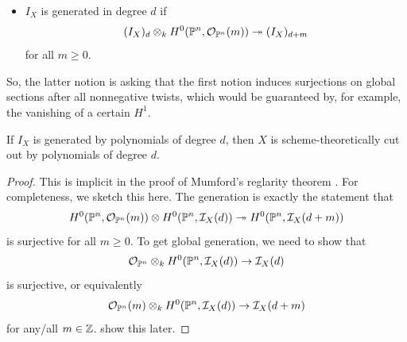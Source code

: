 \documentclass[12pt]{article}
\begin{document}
\begin{itemize}
\begin{rmk}
\begin{itemize}
            \item $I_X$ is generated in degree $d$ if
            \[ (I_X)_d \otimes_k H^0(\mathbb{P}^n,\mathcal{O}_{\mathbb{P}^n}(m)) \twoheadrightarrow (I_X)_{d+m}\]
            for all $m\geq 0$.
        \end{itemize}
        So, the latter notion is asking that the first notion induces surjections on global sections after all nonnegative twists, which would be guaranteed by, for example, the vanishing of a certain $H^1$.
    \end{rmk}

    \begin{lem}
        If $I_X$ is generated by polynomials of degree $d$, then $X$ is scheme-theoretically cut out by polynomials of degree $d$.
    \end{lem}
    \begin{proof}
        This is implicit in the proof of Mumford's reglarity theorem \cite{ein_lectures_nodate}. For completeness, we sketch this here. The generation is exactly the statement that
        \[H^0(\mathbb{P}^n,\mathcal{O}_{\mathbb{P}^n}(m)) \otimes H^0(\mathbb{P}^n,\mathcal{I}_X(d)) \twoheadrightarrow H^0(\mathbb{P}^n,\mathcal{I}_X(d+m))\]
        is surjective for all $m\geq 0$. To get global generation, we need to show that
        \[\mathcal{O}_{\mathbb{P}^n} \otimes_k H^0(\mathbb{P}^n,\mathcal{I}_X(d)) \to \mathcal{I}_X(d)\]
        is surjective, or equivalently
        \[\mathcal{O}_{\mathbb{P}^n}(m) \otimes_k H^0(\mathbb{P}^n,\mathcal{I}_X(d)) \to \mathcal{I}_X(d+m)\]
        for any/all $m\in \mathbb{Z}$. {\color{red} show this later}.
    \end{proof}
    

        
        

\end{itemize}
\end{document}
